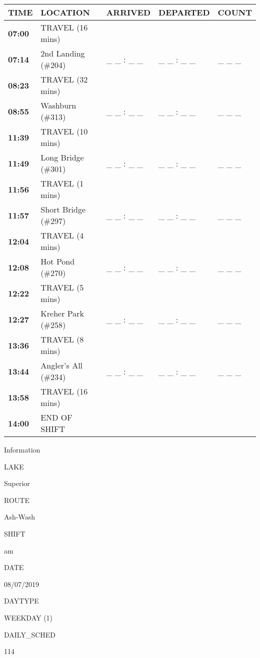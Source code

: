 \documentclass[]{article}
\begin{document}
\begin{tabular}{>{\bfseries}lllll}
\toprule
\textbf{TIME} & \textbf{LOCATION} & \textbf{ARRIVED} & \textbf{DEPARTED} & \textbf{COUNT}\\
\midrule
07:00 & TRAVEL (16 mins) &  &  & \\
07:14 & 2nd Landing (\#204) & \_ \_ : \_ \_ & \_ \_ : \_ \_ & \_ \_ \_\\
08:23 & TRAVEL (32 mins) &  &  & \\
08:55 & Washburn (\#313) & \_ \_ : \_ \_ & \_ \_ : \_ \_ & \_ \_ \_\\
11:39 & TRAVEL (10 mins) &  &  & \\
11:49 & Long Bridge (\#301) & \_ \_ : \_ \_ & \_ \_ : \_ \_ & \_ \_ \_\\
11:56 & TRAVEL (1 mins) &  &  & \\
11:57 & Short Bridge (\#297) & \_ \_ : \_ \_ & \_ \_ : \_ \_ & \_ \_ \_\\
12:04 & TRAVEL (4 mins) &  &  & \\
12:08 & Hot Pond (\#270) & \_ \_ : \_ \_ & \_ \_ : \_ \_ & \_ \_ \_\\
12:22 & TRAVEL (5 mins) &  &  & \\
12:27 & Kreher Park (\#258) & \_ \_ : \_ \_ & \_ \_ : \_ \_ & \_ \_ \_\\
13:36 & TRAVEL (8 mins) &  &  & \\
13:44 & Angler's All (\#234) & \_ \_ : \_ \_ & \_ \_ : \_ \_ & \_ \_ \_\\
13:58 & TRAVEL (16 mins) &  &  & \\
14:00 & END OF SHIFT &  &  & \\
\bottomrule
\end{tabular}\newpage

Information

LAKE

Superior

ROUTE

Ash-Wash

SHIFT

am

DATE

08/07/2019

DAYTYPE

WEEKDAY (1)

DAILY\_SCHED

114

\vspace{24pt}
\end{document}
